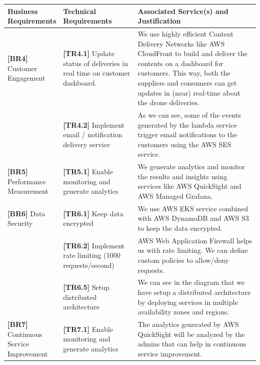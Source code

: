 \documentclass{article}
\begin{document}
\begin{table}[H]
    \centering
    \def\arraystretch{1.75}
    \begin{tabular}{|p{0.2\linewidth}| p{0.3\linewidth} | p{0.5\linewidth} |} \hline 
         \textbf{Business Requirements} &  \textbf{Technical Requirements} & \textbf{Associated Service(s) and Justification}\\ \hline 
         \textbf{[BR4]} Customer Engagement&  \textbf{[TR4.1]} Update status of deliveries in real time on customer dashboard. & We use highly efficient Content Delivery Networks like AWS CloudFront to build and deliver the contents on a dashboard for customers. This way, both the suppliers and consumers can get updates in (near) real-time about the drone deliveries.   
         \\ \hline
          &  \textbf{[TR4.2]} Implement email / notification delivery service &  As we can see, some of the events generated by the lambda service trigger email notifications to the customers using the AWS SES service. \\ \hline 
          
            \textbf{[BR5]} Performance Measurement&  \textbf{[TR5.1]} Enable monitoring and generate analytics & We generate analytics and monitor the results and insights using services like AWS QuickSight and AWS Managed Grafana.\\ \hline
         \textbf{[BR6]} Data Security&  \textbf{[TR6.1]} Keep data encrypted & We use AWS EKS service combined with AWS DynamoDB and AWS S3 to keep the data encrypted. \\ \hline
         &  \textbf{[TR6.2]} Implement rate limiting (1000 requests/second)& AWS Web Application Firewall helps us with rate limiting. We can define custom policies to allow/deny requests.\\ \hline
         &  \textbf{[TR6.5]} Setup distributed architecture &  We can see in the diagram that we have setup a distributed architecture by deploying services in multiple availability zones and regions.\\ \hline
         \textbf{[BR7]} Continuous Service Improvement&  \textbf{[TR7.1]} Enable monitoring and generate analytics & The analytics generated by AWS QuickSight will be analyzed by the admins that can help in continuous service improvement.   \\ \hline


\end{tabular}
\end{table}
\end{document}
